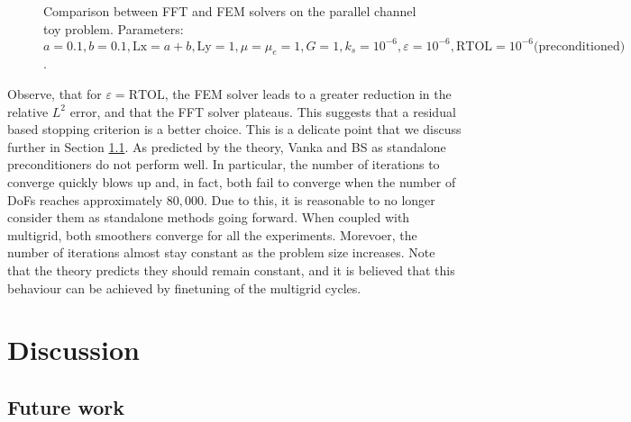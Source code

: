 \documentclass[12pt]{article}
\theoremstyle{theorem}
\begin{document}
\begin{figure}[H]
    \centering
  
    \hfill
  
    \hfill
    \label{fig: time_per_iter_pc}
  
    \caption{Comparison between FFT and FEM solvers on the parallel channel toy problem. Parameters: $a = 0.1, b=0.1, \mathrm{Lx} = a+b, \mathrm{Ly}=1, \mu=\mu_e=1, G=1, k_s = 10^{-6}, \varepsilon = 10^{-6}, \mathrm{RTOL} = 10^{-6} \text{(preconditioned)}$.}
    \label{fig: parallel-channel-comparison} 
\end{figure}

Observe, that for $\varepsilon = \mathrm{RTOL}$, the FEM solver leads to a greater reduction in the relative $L^2$ error, and that the FFT solver plateaus. This suggests that a residual based stopping criterion is a better choice. This is a delicate point that we discuss further in Section \ref{sec: future-work}. As predicted by the theory, Vanka and BS as standalone preconditioners do not perform well. In particular, the number of iterations to converge quickly blows up and, in fact, both fail to converge when the number of DoFs reaches approximately $80, 000$. Due to this, it is reasonable to no longer consider them as standalone methods going forward. When coupled with multigrid, both smoothers converge for all the experiments. Morevoer, the number of iterations almost stay constant as the problem size increases. Note that the theory predicts they should remain constant, and it is believed that this behaviour can be achieved by finetuning of the multigrid cycles. 

\section{Discussion}\label{sec: discussion}

\subsection{Future work}\label{sec: future-work}
\end{document}
